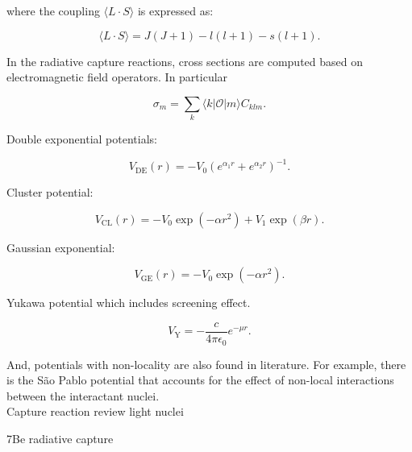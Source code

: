 \documentclass[openany]{book}
\begin{document}
where the coupling  $  \langle L \cdot S \rangle$ is expressed as: 

\begin{equation}  \label{eq:potential_spinOrbit_LSexpansion}
	\langle L \cdot S \rangle = J(J+1) - l(l+1) - s(l+1).
\end{equation}

In the radiative capture reactions, cross sections are computed based on electromagnetic field operators. In particular 

\begin{equation}  \label{eq:radiativeCapture_operator}
	\sigma_m = \sum_{k}{\langle k | \mathcal{O} | m \rangle} C_{klm}.		
\end{equation}


Double exponential potentials: 

\begin{equation} \label{eq:potential_doubleExponential}
	V_{\mathrm{DE}}(r) = - V_0 \left(e^{\alpha_1 r} + e^{\alpha_2 r} \right)^{-1}.
\end{equation}

Cluster potential:

\begin{equation} \label{eq:potential_cluster}
	V_{\mathrm{CL}}(r) = - V_0 \exp{(-\alpha r^2 )} + V_1 \exp{(\beta r)}.
\end{equation}

Gaussian exponential: 

\begin{equation} \label{eq:potential_gaussianExponential}
	V_{\mathrm{GE}}(r) = - V_0 \exp{(-\alpha r^2 )}.
\end{equation}

Yukawa potential  which includes screening effect.

\begin{equation} \label{eq:potential_Yukawa}
	V_{\mathrm{Y}} = -\frac{c}{4\pi\epsilon_0}e^{-\mu r}.
\end{equation}

And, potentials with non-locality are also found in literature. For example, there is the São Pablo potential that accounts for the effect of non-local interactions between the interactant nuclei. \\

Capture reaction review light nuclei\cite{ghasemi_sadeghi_2018}
\cite{dubovichenko_dzhazairov-kakhramanov_2012}

7Be radiative capture \cite{tursunov_turakulov_kadyrov_blokhintsev_2021}
\cite{bertulani_1996}
\end{document}
